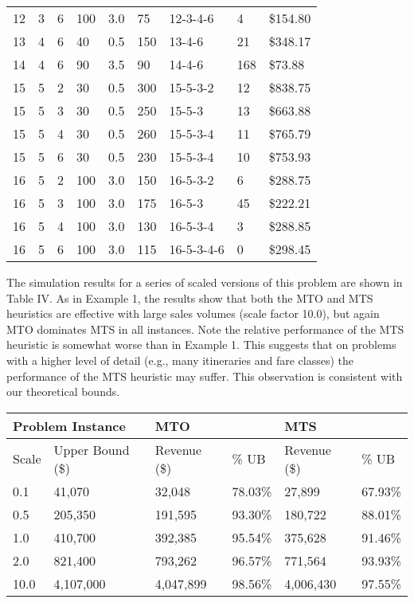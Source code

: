 \begin{longtable}{|l|l|l|l|l|l|l|l|}
12 & 3 & 6 & 100 & 3.0 & 75 & 12-3-4-6 & 4 & \$154.80 \\
13 & 4 & 6 & 40 & 0.5 & 150 & 13-4-6 & 21 & \$348.17 \\
14 & 4 & 6 & 90 & 3.5 & 90 & 14-4-6 & 168 & \$73.88 \\
15 & 5 & 2 & 30 & 0.5 & 300 & 15-5-3-2 & 12 & \$838.75 \\
15 & 5 & 3 & 30 & 0.5 & 250 & 15-5-3 & 13 & \$663.88 \\
15 & 5 & 4 & 30 & 0.5 & 260 & 15-5-3-4 & 11 & \$765.79 \\
15 & 5 & 6 & 30 & 0.5 & 230 & 15-5-3-4 & 10 & \$753.93 \\
16 & 5 & 2 & 100 & 3.0 & 150 & 16-5-3-2 & 6 & \$288.75 \\
16 & 5 & 3 & 100 & 3.0 & 175 & 16-5-3 & 45 & \$222.21 \\
16 & 5 & 4 & 100 & 3.0 & 130 & 16-5-3-4 & 3 & \$288.85 \\
16 & 5 & 6 & 100 & 3.0 & 115 & 16-5-3-4-6 & 0 & \$298.45 \\
\hline
\end{longtable}

The simulation results for a series of scaled versions of this problem are shown in Table IV. As in Example 1, the results show that both the MTO and MTS heuristics are effective with large sales volumes (scale factor 10.0), but again MTO dominates MTS in all instances. Note the relative performance of the MTS heuristic is somewhat worse than in Example 1. This suggests that on problems with a higher level of detail (e.g., many itineraries and fare classes) the performance of the MTS heuristic may suffer. This observation is consistent with our theoretical bounds.

\begin{longtable}{|l|l|l|l|l|l|}
\hline
\multicolumn{2}{|l|}{Problem Instance} & \multicolumn{2}{l|}{MTO} & \multicolumn{2}{l|}{MTS} \\
\hline
Scale & Upper Bound (\$) & Revenue (\$) & \% UB & Revenue (\$) & \% UB \\
\hline
0.1 & 41,070 & 32,048 & 78.03\% & 27,899 & 67.93\% \\
\hline
0.5 & 205,350 & 191,595 & 93.30\% & 180,722 & 88.01\% \\
\hline
1.0 & 410,700 & 392,385 & 95.54\% & 375,628 & 91.46\% \\
\hline
2.0 & 821,400 & 793,262 & 96.57\% & 771,564 & 93.93\% \\
\hline
10.0 & 4,107,000 & 4,047,899 & 98.56\% & 4,006,430 & 97.55\% \\
\hline
\end{longtable}

